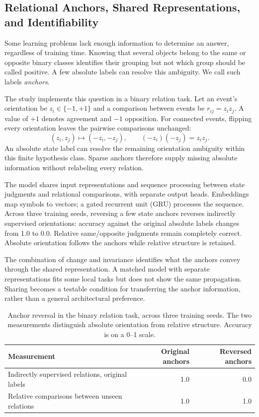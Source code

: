 \subsection{Relational Anchors, Shared Representations, and Identifiability}
\label{sec:anchors}

Some learning problems lack enough information to determine an answer, regardless of training time. Knowing that several objects belong to the same or opposite binary classes identifies their grouping but not which group should be called positive. A few absolute labels can resolve this ambiguity. We call such labels \emph{anchors}.

The study implements this question in a binary relation task. Let an event's orientation be $z_i\in\{-1,+1\}$ and a comparison between events be $r_{ij}=z_i z_j$. A value of $+1$ denotes agreement and $-1$ opposition. For connected events, flipping every orientation leaves the pairwise comparisons unchanged:
\begin{equation}
(z_i,z_j)\mapsto(-z_i,-z_j),\qquad (-z_i)(-z_j)=z_i z_j.
\end{equation}
An absolute state label can resolve the remaining orientation ambiguity within this finite hypothesis class. Sparse anchors therefore supply missing absolute information without relabeling every relation.

The model shares input representations and sequence processing between state judgments and relational comparisons, with separate output heads. Embeddings map symbols to vectors; a gated recurrent unit (GRU) processes the sequence. Across three training seeds, reversing a few state anchors reverses indirectly supervised orientations: accuracy against the original absolute labels changes from 1.0 to 0.0. Relative same/opposite judgments remain completely correct. Absolute orientation follows the anchors while relative structure is retained.

The combination of change and invariance identifies what the anchors convey through the shared representation. A matched model with separate representations fits some local tasks but does not show the same propagation. Sharing becomes a testable condition for transferring the anchor information, rather than a general architectural preference.

\begin{table}[htbp]
\caption{Anchor reversal in the binary relation task, across three training seeds. The two measurements distinguish absolute orientation from relative structure. Accuracy is on a 0--1 scale.}
\label{tab:anchor}
\begin{tabularx}{\linewidth}{@{}Yrr@{}}
\toprule Measurement & Original anchors & Reversed anchors\\\midrule
Indirectly supervised relations, original labels & 1.0 & 0.0\\
Relative comparisons between unseen relations & 1.0 & 1.0\\
\bottomrule
\end{tabularx}
\end{table}

